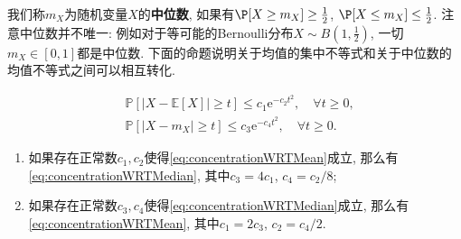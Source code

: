 我们称$m_X$为随机变量$X$的\textbf{中位数}, 如果有$\P[X \geq m_X] \geq \frac12$, $\P[X \leq m_X] \leq \frac12$. 
注意中位数并不唯一: 例如对于等可能的Bernoulli分布$X \sim B(1, \frac12)$, 一切$m_X \in [0,1]$都是中位数. 
下面的命题说明关于均值的集中不等式和关于中位数的均值不等式之间可以相互转化. %
\begin{proposition}[关于均值的集中不等式和关于中位数的均值不等式]
	\begin{align}
		&\mathbb{P}[|X - \mathbb{E}[X]| \geq t] \leq c_1 \mathrm{e}^{- c_2 t^2}, \quad \forall t \geq 0, \label{eq:concentrationWRTMean} \\
		&\mathbb{P}[|X - m_X| \geq t] \leq c_3 \mathrm{e}^{- c_4 t^2}, \quad \forall t \geq 0. \label{eq:concentrationWRTMedian} 
	\end{align}
	\begin{enumerate}[label=(\alph*)]
		\item 如果存在正常数$c_1, c_2$使得\eqref{eq:concentrationWRTMean}成立, 那么有\eqref{eq:concentrationWRTMedian}, 其中$c_3 = 4c_1$, $c_4 = c_2 / 8$; 
		\item 如果存在正常数$c_3, c_4$使得\eqref{eq:concentrationWRTMedian}成立, 那么有\eqref{eq:concentrationWRTMean}, 其中$c_1 = 2c_3$, $c_2 = c_4 / 2$. 
	\end{enumerate}
\end{proposition}


